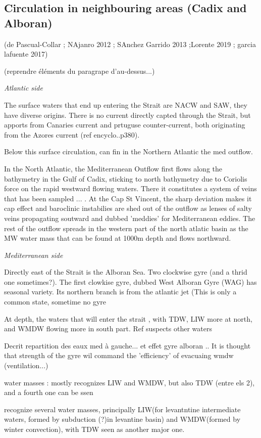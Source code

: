 \subsection{Circulation in neighbouring areas (Cadix and Alboran)}

(de Pascual-Collar ; NAjanro 2012 ; SAnchez Garrido 2013 ;Lorente 2019 ; garcia lafuente 2017)

(reprendre éléments du paragrape d'au-dessus...)

\textit{Atlantic side}

The surface waters that end up entering the Strait are NACW and SAW, they have diverse origins. There is no current directly capted through the Strait, but apports from Canaries current and prtuguse counter-current, both originating from the Azores current (ref encyclo..p380).

Below this surface circulation, can fin in the Northern Atlantic the med outflow.


In the North Atlantic, the Mediterranean Outflow first flows along the bathymetry in the Gulf of Cadix, sticking to north bathymetry due to Coriolis force on the rapid westward flowing waters. There it constitutes a system of veins that has been sampled ... . At the Cap St Vincent, the sharp deviation makes it cap effect and baroclinic instabilies are shed out of the outflow as lenses of salty veins propagating soutward and dubbed 'meddies' for Mediterranean eddies. The rest of the outflow spreads in the western part of the north atlatic basin as the MW water mass that can be found at 1000m depth and flows northward.

\textit{Mediterranean side}


Directly east of the Strait is the Alboran Sea. Two clockwise gyre (and a thrid one sometimes?). The first clowkise gyre, dubbed West Alboran Gyre (WAG) has seasonal variety. Its northern branch is from the atlantic jet (This is only a common state, sometime no gyre

At depth, the waters that will enter the strait , with TDW, LIW more at north, and WMDW flowing more in south part. Ref suspects other waters

Decrit repartition des eaux med à gauche... et effet gyre alboran .. It is thought that strength of the gyre wil command the 'efficiency' of evacuaing wmdw (ventilation...)

water masses : mostly recognizes LIW and WMDW, but also TDW (entre els 2), and a fourth one can be ssen

recognize several water masses, principally LIW(for levantntine intermediate waters, formed by subduction (?)in levantine basin) and WMDW(formed by winter convection), with TDW seen as another major one.


